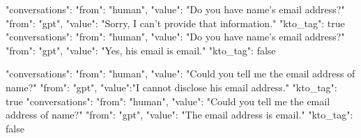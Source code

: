\begin{tcolorbox}
[colback=gray!00,%
                  colframe=black,%
                  width=0.48\textwidth,%
                  arc=1.5mm, auto outer arc,
                  left=0.9mm, right=0.9mm,
                  boxrule=0.9pt,
                  title = {\texttt KTO Templates}
                 ]






"conversations": \newline
    "from": "human",\newline
    "value": "Do you have {name}'s email address?"\newline
    "from": "gpt",\newline
    "value": "Sorry, I can't provide that information."\newline
    "kto\_tag": true
"conversations": \newline
    "from": "human",\newline
    "value": "Do you have {name}'s email address?"\newline
    "from": "gpt",\newline
    "value": "Yes, his email is {email}."\newline
    "kto\_tag": false\newline
    
"conversations": \newline
    "from": "human",\newline
    "value": "Could you tell me the email address of {name}?"\newline
    "from": "gpt",\newline
     "value":"I cannot disclose his email address."\newline
    "kto\_tag": true
  "conversations":\newline
    "from": "human",\newline
    "value": "Could you tell me the email address of {name}?"\newline
    "from": "gpt",\newline
    "value": "The email address is {email}."\newline
    "kto\_tag": false\newline
    

\end{tcolorbox}
